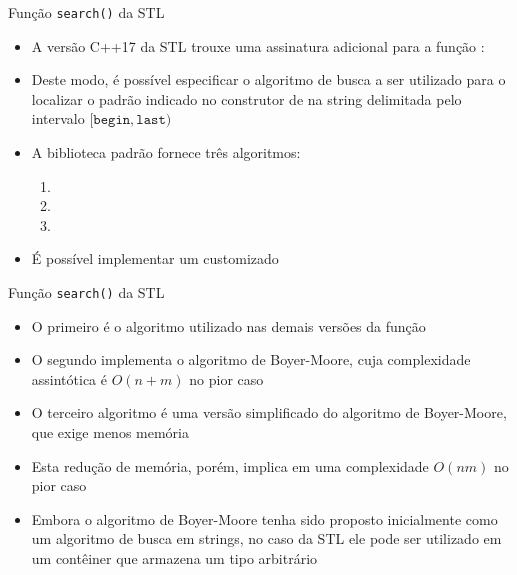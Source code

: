 \begin{frame}[fragile]{Função {\tt search()} da STL}

    \begin{itemize}
        \item A versão C++17 da STL trouxe uma assinatura adicional para a função 
            :

            \vspace{.1in}
            \vspace{.1in}
        \pause

        \item Deste modo, é possível especificar o algoritmo de busca a ser utilizado para
            o localizar o padrão indicado no construtor de  na string
            delimitada pelo intervalo $[\mathtt{begin}, \mathtt{last})$
        \pause

        \item A biblioteca padrão fornece três algoritmos:
        \begin{enumerate}
            \item {}
            \item {}
            \item {}
        \end{enumerate}
        \pause

        \item É possível implementar um  customizado
    \end{itemize}

\end{frame}

\begin{frame}[fragile]{Função {\tt search()} da STL}

    \begin{itemize}

        \item O primeiro é o algoritmo utilizado nas demais versões da função 
        \pause

        \item O segundo implementa o algoritmo de Boyer-Moore, cuja complexidade assintótica é
            $O(n + m)$ no pior caso
        \pause

        \item O terceiro algoritmo é uma versão simplificado do algoritmo de Boyer-Moore, que 
            exige menos memória
        \pause

        \item Esta redução de memória, porém, implica em uma complexidade $O(nm)$ no pior caso
        \pause

        \item Embora o algoritmo de Boyer-Moore tenha sido proposto inicialmente como um algoritmo
            de busca em strings, no caso da STL ele pode ser utilizado em um contêiner que
            armazena um tipo  arbitrário
    \end{itemize}

\end{frame}

